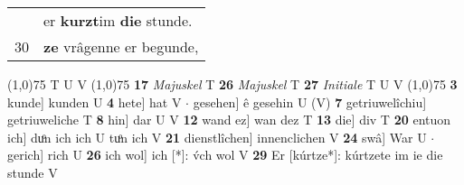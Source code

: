 \documentclass[8pt,a4paper,notitlepage]{article}
\begin{document}
\begin{table}[ht]
\begin{minipage}[t]{0.5\linewidth}
\begin{tabular}{rl}
 & er \textbf{kurzt}im \textbf{die} stunde.\\ 
30 & \textbf{ze} vrâgenne er begunde,\\ 
\end{tabular}
\scriptsize
\line(1,0){75} \newline
T U V \newline
\line(1,0){75} \newline
\textbf{17} \textit{Majuskel} T  \textbf{26} \textit{Majuskel} T  \textbf{27} \textit{Initiale} T U V  \newline
\line(1,0){75} \newline
\textbf{3} kunde] kunden U \textbf{4} hete] hat V  $\cdot$ gesehen] ê gesehin U (V) \textbf{7} getriuwelîchiu] getriuweliche T \textbf{8} hin] dar U V \textbf{12} wand ez] wan dez T \textbf{13} die] div T \textbf{20} entuon ich] duͦn ich ich U tuͦn ich V \textbf{21} dienstlîchen] innenclichen V \textbf{24} swâ] War U  $\cdot$ gerich] rich U \textbf{26} ich wol] ich [*]: v́ch wol V \textbf{29} Er [kúrtze*]: kúrtzete im ie die stunde V \newline
\end{minipage}
\end{table}
\end{document}
